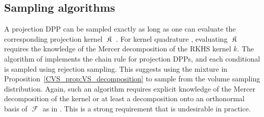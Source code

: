 \documentclass[twoside,11pt]{book}
\numberwithin{theorem}{chapter}
\numberwithin{definition}{chapter}
\numberwithin{proposition}{chapter}
\numberwithin{corollary}{chapter}
\numberwithin{example}{chapter}
\numberwithin{lemma}{chapter}
\numberwithin{assumption}{chapter}
\numberwithin{equation}{chapter}
\numberwithin{figure}{chapter}
\DeclareMathOperator*{\KDPP}{\mathfrak{K}}
\DeclareMathOperator{\F}{\mathcal{F}}
\begin{document}
\subsection{Sampling algorithms}


A projection DPP can be sampled exactly as long as one can evaluate the corresponding projection kernel $\KDPP$ \citep{HoKrPeVi06}. For kernel quadrature \citep{BeBaCh19}, evaluating $\KDPP$ requires the knowledge of the Mercer decomposition of the RKHS kernel $k$. The algorithm of \cite{HoKrPeVi06} implements the chain rule for projection DPPs, and each conditional is sampled using rejection sampling. This suggests using the mixture in Proposition~\ref{CVS_prop:VS_decomposition} to sample from the volume sampling distribution.
Again, such an algorithm requires explicit knowledge of the Mercer decomposition of the kernel or at least a decomposition onto an orthonormal basis of $\F$ as in \citep{KaSaTa19}. This is a strong requirement that is undesirable in practice.
\end{document}
